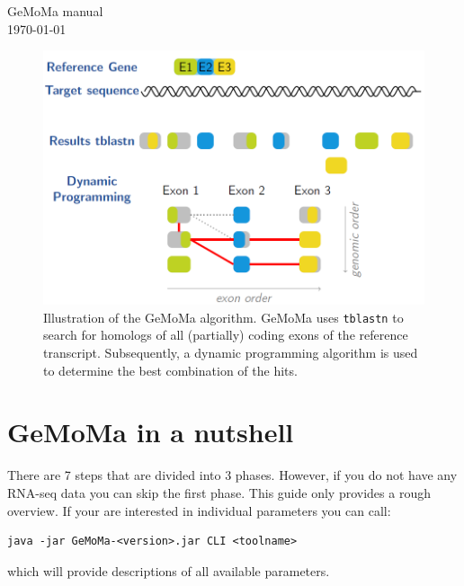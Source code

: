 \documentclass{article}
\begin{document}
\begin{center}
{\Huge GeMoMa manual}\\[5mm]
\today\\[1cm]
\begin{abstract}
Gene Model Mapper (GeMoMa) is a homology-based gene prediction program. GeMoMa uses the annotation of protein-coding genes in a reference genome to infer the annotation of protein-coding genes in a target genome. Thereby, GeMoMa utilizes amino acid and intron position conservation. In addition, GeMoMa allows to incorporate RNA-seq evidence for splice site prediction.
\end{abstract}
\end{center}

\begin{figure}[h!]
\includegraphics[width=\linewidth]{schema}
\caption{Illustration of the GeMoMa algorithm. GeMoMa uses \texttt{tblastn} to search for homologs of all (partially) coding exons of the reference transcript. Subsequently, a dynamic programming algorithm is used to determine the best combination of the hits.}
\end{figure}

\clearpage

\section{GeMoMa in a nutshell}

There are 7 steps that are divided into 3 phases. However, if you do not have any RNA-seq data you can skip the first phase.
This guide only provides a rough overview. If your are interested in individual parameters you can call:
\begin{verbatim}
java -jar GeMoMa-<version>.jar CLI <toolname>
\end{verbatim}
which will provide descriptions of all available parameters.
\end{document}
